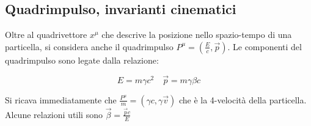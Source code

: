 \subsection{Quadrimpulso, invarianti cinematici}

Oltre al quadrivettore $x^\mu$ che descrive la posizione nello spazio-tempo di una particella, si considera anche il quadrimpulso $P^\mu = (\frac{E}{c}, \vec{p})$. Le componenti del quadrimpulso sono legate dalla relazione:

\begin{equation*}
E = m \gamma c^2 \quad \vec{p} = m \gamma \beta c
\end{equation*}

Si ricava immediatamente che $ \frac{P^\mu}{m} = (\gamma c, \gamma \vec{v})$ che è la 4-velocità della particella. Alcune relazioni utili sono $\vec{\beta} = \frac{\vec{p} c}{E}$
